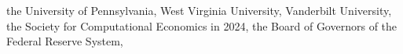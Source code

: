 the University of Pennsylvania, West Virginia University, Vanderbilt University, the Society for Computational Economics in 2024, the Board of Governors of the Federal Reserve System, %

